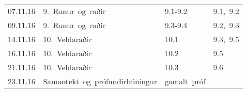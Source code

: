 \begin{longtable}{c|l|l|l}
\hline

07.11.16&
9.~Runur~og~raðir&
9.1-9.2&
9.1,~9.2\\
09.11.16&
9.~Runur~og~raðir&
9.3-9.4&
9.2,~9.3\\

\hline

14.11.16&
10.~Veldaraðir&
10.1&
9.3,~9.5\\
16.11.16&
10.~Veldaraðir&
10.2&
9.5\\

\hline

21.11.16&
10.~Veldaraðir&
10.3&
9.6\\
23.11.16&
Samantekt~og~prófundirbúningur&
gamalt~próf&
\\
\hline
\end{longtable}
